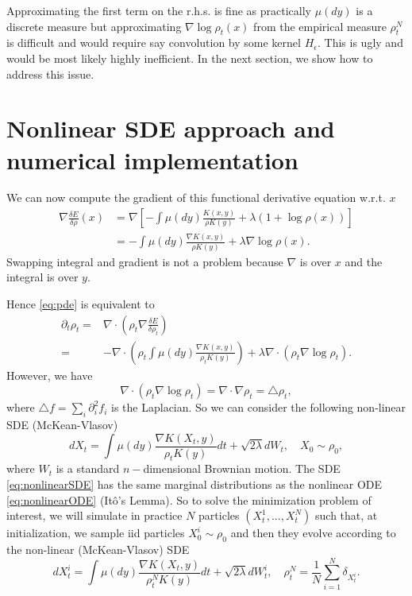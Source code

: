 \documentclass[a4paper]{article}
\newcommand{\variation}[1]{\ensuremath{\frac{\delta E}{\delta #1}}}
\begin{document}
Approximating the first term on the r.h.s. is fine as practically $\mu\left(dy\right)$ is a discrete measure but approximating $\nabla\log\rho_{t}\left(x\right)$ from the empirical measure $\rho_{t}^{N}$ is difficult and would require say convolution by some kernel $H_{\epsilon}$.
This is ugly and would be most likely highly inefficient.
In the next section, we show how to address this issue.


\section{Nonlinear SDE approach and numerical implementation}

We can now compute the gradient of this functional derivative equation w.r.t. $x$
\begin{align*}
\nabla\frac{\delta E}{\delta\rho}\left(x\right) & = \nabla\left[-\int\mu\left(dy\right)\frac{ K(x,y)}{\rho K(y)}+\lambda(1 + \log\rho\left(x\right))\right]\\
&= -\int\mu\left(dy\right)\frac{\nabla K(x,y)}{\rho K(y)}+\lambda\nabla\log\rho\left(x\right).
\end{align*}
Swapping integral and gradient is not a problem because $\nabla$ is over $x$ and the integral is over $y$.

Hence \eqref{eq:pde} is equivalent to
\begin{align*}
\partial_{t}\rho_{t}= & \nabla\cdot\left(\rho_{t}\nabla\variation{\rho_{t}}\right)\\
= & -\nabla\cdot\left(\rho_{t}\int\mu\left(dy\right)\frac{\nabla K(x,y)}{\rho_{t}K(y)}\right)+\lambda\nabla\cdot\left(\rho_{t}\nabla\log\rho_{t}\right).
\end{align*}
However, we have
\[
\nabla\cdot\left(\rho_{t}\nabla\log\rho_{t}\right)=\nabla\cdot\nabla\rho_{t}=\triangle\rho_{t},
\]
where $\triangle f=\sum_{i}\partial_{i}^{2}f_{i}$ is the Laplacian.
So we can consider the following non-linear SDE (McKean-Vlasov) 
\begin{equation}
dX_{t}=\int\mu\left(dy\right)\frac{\nabla K(X_{t},y)}{\rho_{t}K(y)}dt+\sqrt{2\lambda}dW_{t},\quad X_{0}\sim\rho_{0},\label{eq:nonlinearSDE}
\end{equation}
where $W_{t}$ is a standard $n-$dimensional Brownian motion.
The SDE \eqref{eq:nonlinearSDE} has the same marginal distributions as the nonlinear ODE \eqref{eq:nonlinearODE} (It\^o's Lemma).
So to solve the minimization problem of interest, we will simulate in practice $N$ particles $(X_{t}^{1},...,X_{t}^{N})$ such that, at initialization, we sample iid particles $X_{0}^{i}\sim\rho_{0}$ and then they evolve according to the non-linear (McKean-Vlasov) SDE
\[
dX_{t}^{i}=\int\mu\left(dy\right)\frac{\nabla K(X_{t},y)}{\rho_{t}^{N}K(y)}dt+\sqrt{2\lambda}dW_{t}^{i},\quad\rho_{t}^{N}=\frac{1}{N}\sum_{i=1}^{N}\delta_{X_{t}^{i}}.
\]
\end{document}
